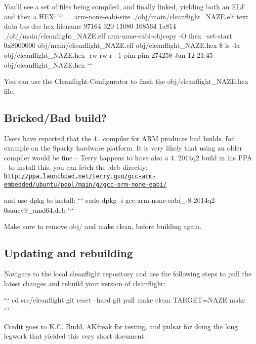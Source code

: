 You'll see a set of files being compiled, and finally linked, yielding both an E\+L\+F and then a H\+E\+X\+: ``` ... arm-\/none-\/eabi-\/size ./obj/main/cleanflight\+\_\+\+N\+A\+Z\+E.elf text data bss dec hex filename 97164 320 11080 108564 1a814 ./obj/main/cleanflight\+\_\+\+N\+A\+Z\+E.elf arm-\/none-\/eabi-\/objcopy -\/\+O ihex --set-\/start 0x8000000 obj/main/cleanflight\+\_\+\+N\+A\+Z\+E.\+elf obj/cleanflight\+\_\+\+N\+A\+Z\+E.\+hex \$ ls -\/la obj/cleanflight\+\_\+\+N\+A\+Z\+E.\+hex -\/rw-\/rw-\/r-- 1 pim pim 274258 Jan 12 21\+:45 obj/cleanflight\+\_\+\+N\+A\+Z\+E.\+hex ```

You can use the Cleanflight-\/\+Configurator to flash the {\ttfamily obj/cleanflight\+\_\+\+N\+A\+Z\+E.\+hex} file.

\subsection*{Bricked/\+Bad build?}

Users have reported that the 4.. compiler for A\+R\+M produces bad builds, for example on the Sparky hardware platform. It is very likely that using an older compiler would be fine -- Terry happens to have also a 4. 2014q2 build in his P\+P\+A -\/ to install this, you can fetch the {\ttfamily .deb} directly\+: \href{http://ppa.launchpad.net/terry.guo/gcc-arm-embedded/ubuntu/pool/main/g/gcc-arm-none-eabi/}{\tt http\+://ppa.\+launchpad.\+net/terry.\+guo/gcc-\/arm-\/embedded/ubuntu/pool/main/g/gcc-\/arm-\/none-\/eabi/}

and use {\ttfamily dpkg} to install\+: ``` sudo dpkg -\/i gcc-\/arm-\/none-\/eabi\+\_-\/8-\/2014q2-\/0saucy9\+\_\+amd64.\+deb ```

Make sure to remove {\ttfamily obj/} and {\ttfamily make clean}, before building again.

\subsection*{Updating and rebuilding}

Navigate to the local cleanflight repository and use the following steps to pull the latest changes and rebuild your version of cleanflight\+:

``` cd src/cleanflight git reset --hard git pull make clean T\+A\+R\+G\+E\+T=N\+A\+Z\+E make ```

Credit goes to K.\+C. Budd, A\+Kfreak for testing, and pulsar for doing the long legwork that yielded this very short document. 